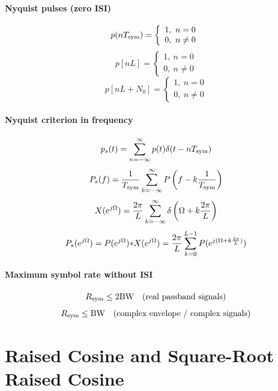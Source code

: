 \paragraph{Nyquist pulses (zero ISI)}
\begin{equation}
p(n {T_{\textrm{sym}}}) = \left\{ \begin{array}{l} 1,~n = 0 \\ 0,~n \ne 0 \end{array} \right.
\label{eq:nyquistPulses}
\end{equation}
\[
p[n L] = \left\{ \begin{array}{l} 1,~n = 0 \\ 0,~n \ne 0 \end{array} \right.
\]
\[
p[n L + N_0] = \left\{ \begin{array}{l} 1,~n = 0 \\ 0,~n \ne 0 \end{array} \right.
\]

\paragraph{Nyquist criterion in frequency}
\[
p_s(t) = \sum_{n=-\infty}^{\infty} p(t) \delta(t-n {T_{\textrm{sym}}})
\]
\begin{equation}
P_s(f) = \frac{1}{{T_{\textrm{sym}}}} \sum_{k=-\infty}^{\infty} P \left( f - k \frac{1}{{T_{\textrm{sym}}}} \right)
\label{eq:nyquistCondition}
\end{equation}
\[
X(e^{j{\Omega}})=\frac{2 \pi}{L}  \sum_{k=-\infty}^{\infty} \delta\left({\Omega}+k \frac{2 \pi}{L}\right)
\]
\begin{equation}
P_s(e^{j{\Omega}})=  P(e^{j{\Omega}}) {\ast} X(e^{j{\Omega}}) = \frac{2 \pi}{L}  \sum_{k=0}^{L-1} P(e^{j({\Omega}+k \frac{2 \pi}{L})})
\label{eq:nyq_criterion}
\end{equation}

\paragraph{Maximum symbol rate without ISI}
\begin{equation}
{R_{\textrm{sym}}} \le 2 {\textrm{BW}} \quad \text{(real passband signals)}
\label{eq:nyquistZeroISI}
\end{equation}
\begin{equation}
{R_{\textrm{sym}}} \le {\textrm{BW}} \quad \text{(complex envelope / complex signals)}
\label{eq:nyquistZeroISIComplexEnvelope}
\end{equation}

\section*{Raised Cosine and Square-Root Raised Cosine}

